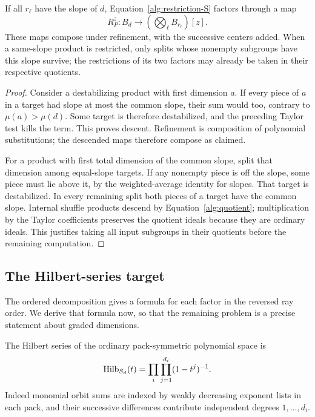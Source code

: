 \begin{lemma}\label{alg:restrictions}
If all $r_\ell$ have the slope of $d$,
Equation~\eqref{alg:restriction-S} factors through a map
\begin{equation}\label{alg:restriction}
 R_P^z:B_d\longrightarrow
       \left(\bigotimes_\ell B_{r_\ell}\right)[z].
\end{equation}
These maps compose under refinement, with the successive centers
added.  When a same-slope product is restricted, only splits whose
nonempty subgroups have this slope survive; the restrictions of its
two factors may already be taken in their respective quotients.
\end{lemma}

\begin{proof}
Consider a destabilizing product with first dimension $a$.  If every
piece of $a$ in a target had slope at most the common slope, their sum
would too, contrary to $\mu(a)>\mu(d)$.  Some target is therefore
destabilized, and the preceding Taylor test kills the term.  This
proves descent.  Refinement is composition of polynomial substitutions;
the descended maps therefore compose as claimed.

For a product with first total dimension of the common slope, split
that dimension among equal-slope targets.  If any nonempty piece is
off the slope, some piece must lie above it, by the weighted-average
identity for slopes.  That target is destabilized.  In every remaining
split both pieces of a target have the common slope.  Internal shuffle
products descend by Equation~\eqref{alg:quotient}; multiplication by
the Taylor coefficients preserves the quotient ideals because they
are ordinary ideals.  This justifies taking all input subgroups in
their quotients before the remaining computation.
\end{proof}

\subsection{The Hilbert-series target}

The ordered decomposition gives a formula for each factor in the
reversed ray order.  We derive that formula now, so that the remaining
problem is a precise statement about graded dimensions.

The Hilbert series of the ordinary pack-symmetric polynomial space is
\begin{equation}\label{alg:ordinary-hilbert}
 \operatorname{Hilb}_{S_d}(t)=\prod_i\prod_{j=1}^{d_i}(1-t^j)^{-1}.
\end{equation}
Indeed monomial orbit sums are indexed by weakly decreasing exponent
lists in each pack, and their successive differences contribute
independent degrees $1,\ldots,d_i$.

